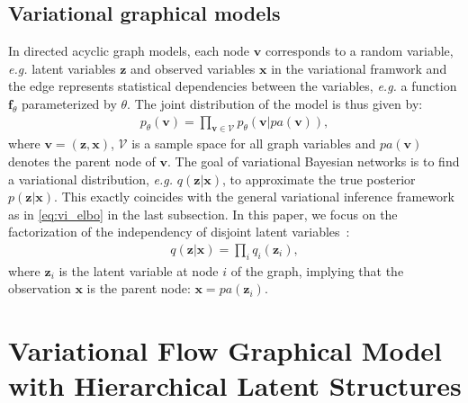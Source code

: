 \documentclass{article} %
\begin{document}
\subsection{Variational graphical models}
In directed acyclic graph models, each node $\mathbf{v}$ corresponds to a random variable, \textit{e.g.} latent variables $\mathbf{z}$ and observed variables $\mathbf{x}$ in the variational framwork and the edge represents statistical dependencies between the variables, \textit{e.g.} a function $\mathbf{f}_\theta$ parameterized by $\theta$.  The joint distribution of the model is thus given by:
\begin{align}
    p_\theta(\mathbf{v}) = \prod_{\mathbf{v} \in \mathcal{V}} p_\theta(\mathbf{v}|pa(\mathbf{v})),
\end{align}
where $\mathbf{v}=(\mathbf{z}, \mathbf{x})$, $\mathcal{V}$ is a sample space for all graph variables and $pa(\mathbf{v})$ denotes the parent node of $\mathbf{v}$. The goal of variational Bayesian networks is to find a variational distribution, \textit{e.g.} $q(\mathbf{z}|\mathbf{x})$, to approximate the true posterior $p(\mathbf{z}|\mathbf{x})$. This exactly coincides with the general variational inference framework as in \eqref{eq:vi_elbo} in the last subsection. In this paper, we focus on the factorization of the independency of disjoint latent variables~\cite{bishop2003vibes}:
\begin{align}
    q(\mathbf{z}|\mathbf{x}) = \prod_i q_i(\mathbf{z}_i),
\end{align}
where $\mathbf{z}_i$ is the latent variable at node $i$ of the graph, implying that the observation $\mathbf{x}$ is the parent node: $\mathbf{x}=pa(\mathbf{z}_i)$. 

\section{Variational Flow Graphical Model with Hierarchical Latent Structures}
\end{document}
